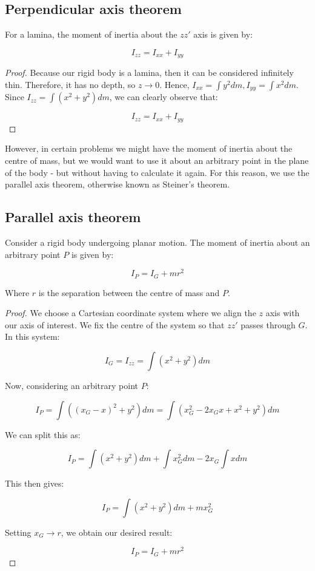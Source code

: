 \documentclass[12pt]{article}
\begin{document}
\subsection{Perpendicular axis theorem}

\begin{theorem}
    For a lamina, the moment of inertia about the $zz'$ axis is given by:

    \[ I_{zz} = I_{xx} + I_{yy} \]
\end{theorem}

\begin{proof}
    Because our rigid body is a lamina, then it can be considered infinitely thin. Therefore, it has no depth, so $z \to 0$. Hence, $I_{xx} = \int y^2dm, I_{yy} = \int x^2dm$. Since $I_{zz} = \int (x^2 + y^2)dm$, we can clearly observe that:

    \[ I_{zz} = I_{xx} + I_{yy} \]
\end{proof}

However, in certain problems we might have the moment of inertia about the centre of mass, but we would want to use it about an arbitrary point in the plane of the body - but without having to calculate it again. For this reason, we use the parallel axis theorem, otherwise known as Steiner's theorem.

\subsection{Parallel axis theorem}

\begin{theorem}
    Consider a rigid body undergoing planar motion. The moment of inertia about an arbitrary point $P$ is given by:

    \[ I_P = I_G + mr^2 \]

    Where $r$ is the separation between the centre of mass and $P$.
\end{theorem}

\begin{proof}
    We choose a Cartesian coordinate system where we align the $z$ axis with our axis of interest. We fix the centre of the system so that $zz'$ passes through $G$. In this system:

    \[ I_G = I_{zz} = \int (x^2 + y^2)dm \]

    Now, considering an arbitrary point $P$:

    \[ I_P = \int ((x_G - x)^2 + y^2)dm = \int (x_G^2 - 2x_Gx + x^2 + y^2)dm \]

    We can split this as:

    \[ I_P = \int (x^2 + y^2)dm + \int x_G^2dm - 2x_G\int xdm \]

    This then gives:

    \[ I_P = \int(x^2 + y^2)dm + mx_G^2 \]

    Setting $x_G \to r$, we obtain our desired result:

    \[ I_P = I_G + mr^2 \]
\end{proof}
\end{document}
